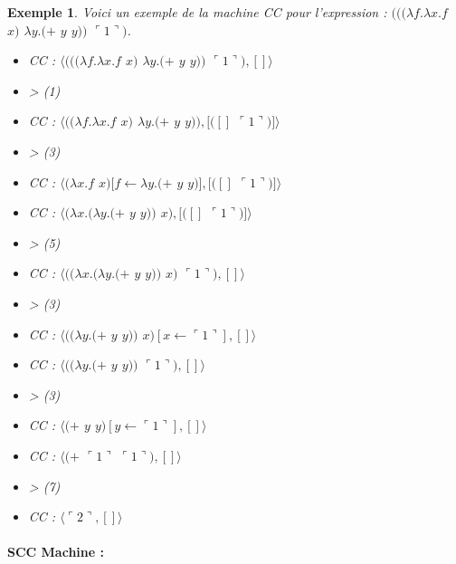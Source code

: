 \documentclass[10pt,a4paper]{report}
\newtheorem{ex}{Exemple}
\begin{document}
\begin{ex}
	Voici un exemple de la machine CC pour l'expression : $(((\lambda f.\lambda x.f$ $x)$ $\lambda y.(+$ $y$ $y))$ $\ulcorner 1\urcorner)$.
	
	\begin{multicols}{2}\raggedright{
			\begin{itemize}
				\item[] CC : $\langle(((\lambda f.\lambda x.f$ $x)$ $\lambda y.(+$ $y$ $y))$ $\ulcorner 1\urcorner),[]\rangle$
				\item[] > (1) 
				\item[] CC : $\langle((\lambda f.\lambda x.f$ $x)$ $\lambda y.(+$ $y$ $y)),[([]$ $\ulcorner 1\urcorner)]\rangle$
				\item[] > (3)
				\item[] CC : $\langle(\lambda x.f$ $x)[f \leftarrow \lambda y.(+$ $y$ $y)],[([]$ $\ulcorner 1\urcorner)]\rangle$
				\item[] CC : $\langle(\lambda x.(\lambda y.(+$ $y$ $y))$ $x),[([]$ $\ulcorner 1\urcorner)]\rangle$
				\item[] > (5)
				
			\end{itemize}
			
			\begin{itemize}
				\item[] CC : $\langle((\lambda x.(\lambda y.(+$ $y$ $y))$ $x)$ $\ulcorner 1\urcorner),[]\rangle$
				\item[] > (3) 
				\item[] CC : $\langle((\lambda y.(+$ $y$ $y))$ $x)[x \leftarrow \ulcorner 1\urcorner],[]\rangle$
				\item[] CC : $\langle((\lambda y.(+$ $y$ $y))$ $\ulcorner 1\urcorner),[]\rangle$
				\item[] > (3) 
				\item[] CC : $\langle(+$ $y$ $y)[y \leftarrow \ulcorner 1\urcorner],[]\rangle$
				\item[] CC : $\langle(+$ $\ulcorner 1\urcorner$ $\ulcorner 1\urcorner),[]\rangle$
				\item[] > (7)
				\item[] CC : $\langle\ulcorner 2\urcorner,[]\rangle$
			\end{itemize}
		}
	\end{multicols}
\end{ex}




\paragraph{SCC Machine :}
\end{document}
